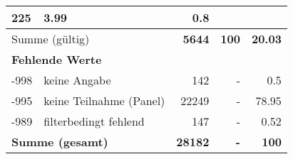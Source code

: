 \begin{longtable}{lXrrr}
       \num{225} &
       \num[round-mode=places,round-precision=2]{3,99} &
         \num[round-mode=places,round-precision=2]{0,8} \\
     \midrule
     \multicolumn{2}{l}{Summe (gültig)} &
       \textbf{\num{5644}} &
     \textbf{100} &
       \textbf{\num[round-mode=places,round-precision=2]{20,03}} \\
     \multicolumn{5}{l}{\textbf{Fehlende Werte}}\\
       -998 &
       keine Angabe &
         \num{142} &
        - &
         \num[round-mode=places,round-precision=2]{0,5} \\
       -995 &
       keine Teilnahme (Panel) &
         \num{22249} &
        - &
         \num[round-mode=places,round-precision=2]{78,95} \\
       -989 &
       filterbedingt fehlend &
         \num{147} &
        - &
         \num[round-mode=places,round-precision=2]{0,52} \\
     \midrule
     \multicolumn{2}{l}{\textbf{Summe (gesamt)}} &
          \textbf{\num{28182}} &
        \textbf{-} &
        \textbf{100} \\
     \bottomrule
     \end{longtable}
     
